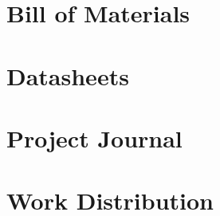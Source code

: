 \documentclass[12pt]{article}
\begin{document}
\section{Bill of Materials}
\section{Datasheets}
\section{Project Journal}
\section{Work Distribution}
\end{document}
